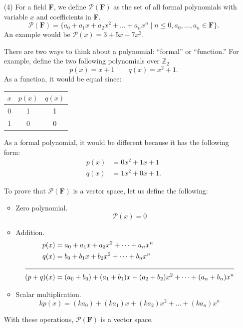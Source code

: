 \documentclass[11pt]{article}
\begin{document}
\begin{enumerate}
        \item[(4)] For a field \textbf{F}, we define \(\mathcal{P}(\textbf{F})\) as the set of all formal polynomials with variable \(x\) and coefficients in \textbf{F}. \[\mathcal{P}(\textbf{F}) = \{a_0 + a_1 x + a_2 x^2 + \dots + a_n x^n \mid n \leq 0, a_0, \dots, a_n \in \textbf{F}\}.\] An example would be \(\mathcal{P}(x) = 3 + 5x - 7x^2.\)
        
        \vspace{1em}

        There are two ways to think about a polynomial: ``formal'' or ``function.'' For example, define the two following polynomials over \(\mathbb{Z}_2\) \[p(x) = x + 1 \qquad q(x) = x^2 + 1.\] As a function, it would be equal since:
        \begin{center}
            \begin{tabular}{| c | c | c |} \hline
                $x$ & $p(x)$ & $q(x)$ \\ \hline
                0   &   1    &   1    \\ \hline
                1   &   0    &   0    \\ \hline    
            \end{tabular}
        \end{center}
        As a formal polynomial, it would be different because it has the following form:
        \begin{align*}
            p(x) &= 0x^2 + 1x + 1 \\
            q(x) &= 1x^2 + 0x + 1.
        \end{align*}

        \pagebreak

        To prove that \(\mathcal{P}(\textbf{F})\) is a vector space, let us define the following:
        \begin{itemize}
            \item Zero polynomial. \[\mathcal{P}(x) = 0\]
            \item Addition.
            \begin{align*}
                p(x)        &= a_0 + a_1x + a_2 x^2 + \dots + a_n x^n \\
                q(x)        &= b_0 + b_1x + b_2 x^2 + \dots + b_n x^n \\
                \cline{1-2}
                (p + q)(x)  &= (a_0 + b_0) + (a_1 + b_1)x + (a_2 + b_2)x^2 + \dots + (a_n + b_n) x^n
            \end{align*}
            \item Scalar multiplication. \[kp(x) = (ka_0) + (ka_1)x + (ka_2) x^2 + \dots + (k a_n) x^n\]
        \end{itemize}
        With these operations, \(\mathcal{P}(\textbf{F})\) is a vector space.
    \end{enumerate}
\end{document}
